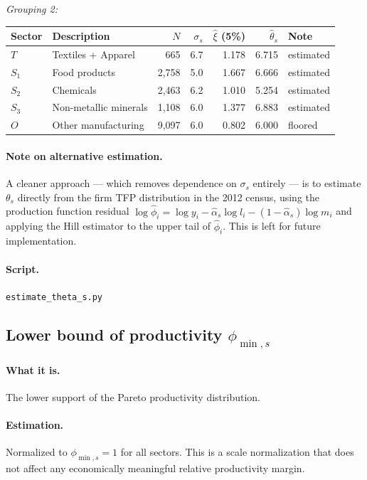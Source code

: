 \documentclass[12pt]{article}
\begin{document}
\noindent\textit{Grouping 2:}
\begin{center}
\begin{tabular}{llrrrrl}
\toprule
Sector & Description & $N$ & $\sigma_s$ & $\hat\xi$ (5\%) &
$\hat\theta_s$ & Note \\
\midrule
$T$   & Textiles + Apparel    & 665   & 6.7 & 1.178 & 6.715 & estimated \\
$S_1$ & Food products         & 2,758 & 5.0 & 1.667 & 6.666 & estimated \\
$S_2$ & Chemicals             & 2,463 & 6.2 & 1.010 & 5.254 & estimated \\
$S_3$ & Non-metallic minerals & 1,108 & 6.0 & 1.377 & 6.883 & estimated \\
$O$   & Other manufacturing   & 9,097 & 6.0 & 0.802 & 6.000 & floored \\
\bottomrule
\end{tabular}
\end{center}

\paragraph{Note on alternative estimation.}
A cleaner approach --- which removes dependence on $\sigma_s$ entirely --- is
to estimate $\theta_s$ directly from the firm TFP distribution in the 2012
census, using the production function residual
$\log\hat\phi_i = \log y_i - \hat\alpha_s \log l_i -
(1-\hat\alpha_s)\log m_i$
and applying the Hill estimator to the upper tail of $\hat\phi_i$.
This is left for future implementation.

\paragraph{Script.} \texttt{estimate\_theta\_s.py}

\subsection{Lower bound of productivity $\phi_{\min,s}$}

\paragraph{What it is.}
The lower support of the Pareto productivity distribution.

\paragraph{Estimation.}
Normalized to $\phi_{\min,s} = 1$ for all sectors. This is a scale
normalization that does not affect any economically meaningful relative
productivity margin.
\end{document}
